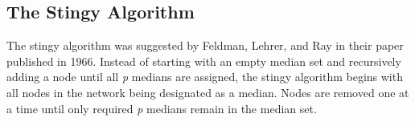\documentclass[11pt]{article}
\newcommand{\np}{\newpage}
\begin{document}
\np
	\subsection{The Stingy Algorithm} \label{stingyalgo}
	The stingy algorithm was suggested by Feldman,  Lehrer,  and Ray  in their paper \cite{FELD66} published in 1966.  
	Instead of starting with an empty median set and recursively adding a node until all \textit{p} medians are assigned, the stingy algorithm begins with all nodes in the network being designated as a median.  Nodes are removed one at a time until only required \textit{p} medians remain in the median set.
	
\end{document}
